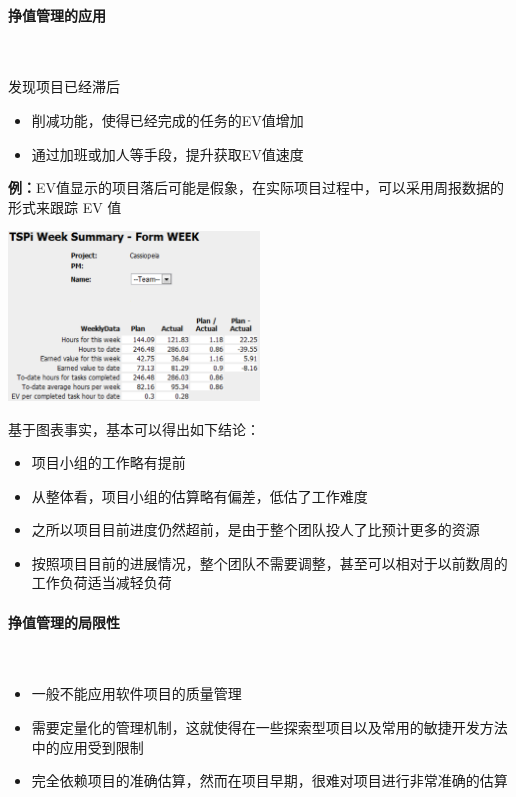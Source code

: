 \paragraph{挣值管理的应用}~{} \par
发现项目已经滞后
\vspace{-0.8em}
\begin{multicols}{2}
    \begin{itemize}
        \item 削减功能，使得已经完成的任务的EV值增加
        \item 通过加班或加人等手段，提升获取EV值速度
    \end{itemize}
\end{multicols}
\vspace{-1em}

\textbf{例：}EV值显示的项目落后可能是假象，在实际项目过程中，可以采用周报数据的形式来跟踪 EV 值

\begin{table}
    \centering
    \vspace{-1em}
    \includegraphics[width=0.5\textwidth]{images/EVM应用示例.png}
    \vspace{-3.5em}
\end{table}
基于图表事实，基本可以得出如下结论：
\begin{itemize}
    \item 项目小组的工作略有提前
    \item 从整体看，项目小组的估算略有偏差，低估了工作难度
    \item 之所以项目目前进度仍然超前，是由于整个团队投人了比预计更多的资源
    \item 按照项目目前的进展情况，整个团队不需要调整，甚至可以相对于以前数周的工作负荷适当减轻负荷
\end{itemize}

\paragraph{挣值管理的局限性}~{} \par
\begin{itemize}
    \item 一般不能应用软件项目的质量管理
    \item 需要定量化的管理机制，这就使得在一些探索型项目以及常用的敏捷开发方法中的应用受到限制
    \item 完全依赖项目的准确估算，然而在项目早期，很难对项目进行非常准确的估算
\end{itemize}

